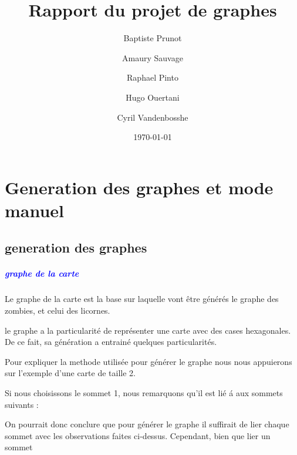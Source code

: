 \documentclass{report}
\title{Rapport du projet de graphes}
\author{Baptiste Prunot
\and Amaury Sauvage
\and Raphael Pinto
\and Hugo Ouertani
\and Cyril Vandenbosshe}
\date{\today}
\begin{document}
	\maketitle 
	
	\chapter{Generation des graphes et mode manuel}
		\section{generation des graphes}
			
			\paragraph{\textcolor{blue}{graphe de la carte}}
			Le graphe de la carte est la base sur laquelle vont \^etre g\'en\'er\'es le graphe des zombies, et celui des licornes.
			
			le graphe a la particularit\'e de repr\'esenter une carte avec des cases hexagonales. De ce fait, sa g\'en\'eration a entrain\'e quelques particularit\'es.
			
			Pour expliquer la methode utilis\'ee pour g\'en\'erer le graphe nous nous appuierons sur l'exemple d'une carte de taille 2.
			
			\begin{center}
			\end{center}
			
			Si nous choisissons le sommet 1, nous remarquons qu'il est li\'e \'a aux sommets suivants :
			
			
			On pourrait donc conclure que pour générer le graphe il suffirait de lier chaque sommet avec les observations faites ci-dessus. Cependant, bien que lier un sommet
			
\end{document}
